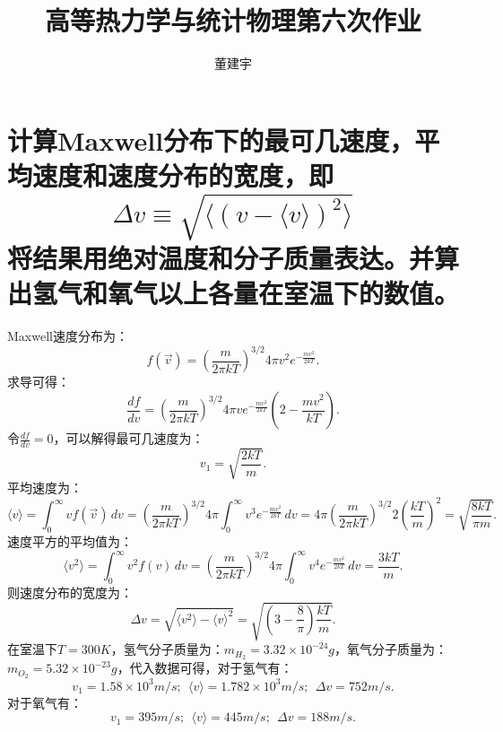 \documentclass[reqno,a4paper,12pt]{amsart}
\title{高等热力学与统计物理第六次作业}
\author{董建宇}
\begin{document}
\maketitle

\titleformat{\section}[hang]{\small}{\thesection}{0.8em}{}{}
\titleformat{\subsection}[hang]{\small}{\thesubsection}{0.8em}{}{}

\section{计算Maxwell分布下的最可几速度，平均速度和速度分布的宽度，即
\[
	\Delta v \equiv \sqrt{\langle (v - \langle v \rangle)^2 \rangle}
\]
将结果用绝对温度和分子质量表达。并算出氢气和氧气以上各量在室温下的数值。
}
\begin{tcolorbox}[breakable, colback = black!5!white, colframe = black]
Maxwell速度分布为：
\[
	f(\vec{v}) = \left( \frac{m}{2\pi kT} \right)^{3/2} 4\pi v^2 e^{-\frac{mv^2}{2kT}}.
\]
求导可得：
\[
	\frac{df}{dv} = \left( \frac{m}{2\pi kT} \right)^{3/2} 4\pi v e^{-\frac{mv^2}{2kT}}\left( 2 - \frac{mv^2}{kT} \right).
\]
令$\frac{df}{dv} = 0$，可以解得最可几速度为：
\[
	v_1 = \sqrt{\frac{2kT}{m}}.
\]
平均速度为：
\[
	\langle v \rangle = \int_0^{\infty} v f(\vec{v}) \,dv = \left( \frac{m}{2\pi kT} \right)^{3/2} 4\pi \int_0^\infty v^3 e^{-\frac{mv^2}{2kT}}\,dv = 4\pi \left( \frac{m}{2\pi kT} \right)^{3/2} 2\left( \frac{kT}{m} \right)^2 = \sqrt{\frac{8kT}{\pi m}}.
\]
速度平方的平均值为：
\[
	\langle v^2 \rangle = \int_0^\infty v^2 f(v)\,dv = \left( \frac{m}{2\pi kT} \right)^{3/2} 4\pi \int_0^\infty v^4e^{-\frac{mv^2}{2kT}}\,dv = \frac{3kT}{m}.
\]
则速度分布的宽度为：
\[
	\Delta v = \sqrt{\langle v^2 \rangle - \langle v \rangle^2} = \sqrt{\left(3 - \frac{8}{\pi}\right) \frac{kT}{m}}.
\]
在室温下$T = 300K$，氢气分子质量为：$m_{H_2} = 3.32 \times 10^{-24}g$，氧气分子质量为：$m_{O_2} = 5.32 \times 10^{-23}g$，代入数据可得，对于氢气有：
\[
	v_1 = 1.58 \times 10^3 m/s; ~~ \langle v \rangle = 1.782 \times 10^3 m/s; ~~ \Delta v = 752 m/s.
\]
对于氧气有：
\[
	v_1 = 395m/s; ~~ \langle v \rangle = 445m/s; ~~ \Delta v = 188m/s.
\]
\end{tcolorbox}
\end{document}
